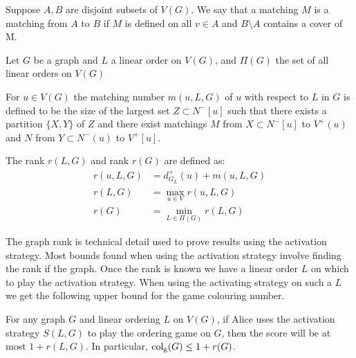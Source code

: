 \begin{definition} \label{defnRank}
    Suppose $A,B$ are disjoint subsets of $V(G)$. We say that a matching $M$ is a matching from $A$ to $B$ if $M$ is defined on all $v\in A$ and $B\setminus A$ contains a cover of M. 
    
    Let $G$ be a graph and $L$ a linear order on $V(G)$, and $\Pi(G)$ the set of all linear orders on $V(G)$
    
    For $u \in V(G)$ the matching number $m(u, L, G)$ of $u$ with respect to $L$ in $G$ is defined to be the size of the largest set $Z \subset N^-[u]$ such that there exists a partition $\{X, Y\}$ of $Z$ and there exist matchings $M$ from
    $X\subset N^-[u]$ to $V^+(u)$ and $N$ from $Y\subset N^-(u)$ to $V^+[u]$.
    
    The rank $r(L,G)$ and rank $r(G)$ are defined as:
    \begin{align*}
    r(u,L,G) & = d^+_{G_L}(u) + m(u,L,G) \\
    r(L,G)   & = \max_{u \in V}r(u,L,G)  \\
    r(G)     & = \min_{L \in \Pi(G)} r(L,G)
    \end{align*}
\end{definition}

The graph rank is technical detail used to prove results using the activation strategy. Most bounds found when using the activation strategy involve finding the rank if the graph. Once the rank is known we have a linear order $L$ on which to play the activation strategy. When using the activating strategy on such a $L$ we get the following upper bound for the game colouring number. 

\begin{theorem} \label{thm:KIERSTEAD1}
    For any graph $G$ and linear ordering $L$ on $V(G)$, if Alice uses the activation strategy $S(L, G)$ to play the ordering game on $G$, then the score will be at most $1+r(L, G)$. In particular, $\operatorname{col_g}(G) \leq 1+r(G)$.
\end{theorem}

